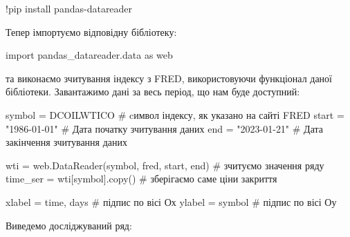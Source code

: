 \documentclass[
  letterpaper,
]{report}
\newenvironment{Shaded}{\begin{snugshade}}{\end{snugshade}}
\newcommand{\CommentTok}[1]{\textcolor[rgb]{0.37,0.37,0.37}{#1}}
\newcommand{\ImportTok}[1]{\textcolor[rgb]{0.00,0.46,0.62}{#1}}
\newcommand{\NormalTok}[1]{\textcolor[rgb]{0.00,0.23,0.31}{#1}}
\newcommand{\OperatorTok}[1]{\textcolor[rgb]{0.37,0.37,0.37}{#1}}
\newcommand{\StringTok}[1]{\textcolor[rgb]{0.13,0.47,0.30}{#1}}
\begin{document}
\begin{Shaded}
\begin{Highlighting}[]
\OperatorTok{!}\NormalTok{pip install pandas}\OperatorTok{{-}}\NormalTok{datareader}
\end{Highlighting}
\end{Shaded}

Тепер імпортуємо відповідну бібліотеку:

\begin{Shaded}
\begin{Highlighting}[]
\ImportTok{import}\NormalTok{ pandas\_datareader.data }\ImportTok{as}\NormalTok{ web}
\end{Highlighting}
\end{Shaded}

та виконаємо зчитування індексу з FRED, використовуючи функціонал даної
бібліотеки. Завантажимо дані за весь період, що нам буде доступний:

\begin{Shaded}
\begin{Highlighting}[]
\NormalTok{symbol }\OperatorTok{=} \StringTok{\textquotesingle{}DCOILWTICO\textquotesingle{}}    \CommentTok{\# cимвол індексу, як указано на сайті FRED}
\NormalTok{start }\OperatorTok{=} \StringTok{"1986{-}01{-}01"}     \CommentTok{\# Дата початку зчитування даних}
\NormalTok{end }\OperatorTok{=} \StringTok{"2023{-}01{-}21"}       \CommentTok{\# Дата закінчення зчитування даних}

\NormalTok{wti }\OperatorTok{=}\NormalTok{ web.DataReader(symbol, }\StringTok{\textquotesingle{}fred\textquotesingle{}}\NormalTok{, start, end) }\CommentTok{\# зчитуємо значення ряду }
\NormalTok{time\_ser }\OperatorTok{=}\NormalTok{ wti[symbol].copy()                    }\CommentTok{\# зберігаємо саме ціни закриття}

\NormalTok{xlabel }\OperatorTok{=} \StringTok{\textquotesingle{}time, days\textquotesingle{}}    \CommentTok{\# підпис по вісі Ох }
\NormalTok{ylabel }\OperatorTok{=}\NormalTok{ symbol          }\CommentTok{\# підпис по вісі Оу}
\end{Highlighting}
\end{Shaded}

Виведемо досліджуваний ряд:
\end{document}
